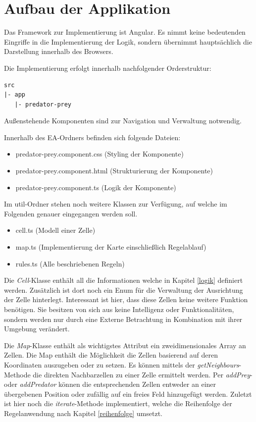 \documentclass[]{scrartcl}
\begin{document}
\newpage
\section{Aufbau der Applikation}
\label{aufbau}
Das Framework zur Implementierung ist Angular. Es nimmt keine bedeutenden Eingriffe in die Implementierung der Logik, sondern übernimmt hauptsächlich die Darstellung innerhalb des Browsers.


Die Implementierung erfolgt innerhalb nachfolgender Orderstruktur:
\begin{lstlisting}[backgroundcolor=\color{lightgray}]
src
|- app
   |- predator-prey
\end{lstlisting}
Außenstehende Komponenten sind zur Navigation und Verwaltung notwendig.

Innerhalb des EA-Ordners befinden sich folgende Dateien:
\begin{itemize}
\item predator-prey.component.css (Styling der Komponente)
\item predator-prey.component.html (Strukturierung der Komponente)
\item predator-prey.component.ts (Logik der Komponente)
\end{itemize}

Im util-Ordner stehen noch weitere Klassen zur Verfügung, auf welche im Folgenden genauer eingegangen werden soll.
\begin{itemize}
	\item cell.ts (Modell einer Zelle)
	\item map.ts (Implementierung der Karte einschließlich Regelablauf)
	\item rules.ts (Alle beschriebenen Regeln)
\end{itemize}

Die \textit{Cell}-Klasse enthält all die Informationen welche in Kapitel \ref{logik} definiert werden. Zusätzlich ist dort noch ein Enum für die Verwaltung der Ausrichtung der Zelle hinterlegt. Interessant ist hier, dass diese Zellen keine weitere Funktion benötigen. Sie besitzen von sich aus keine Intelligenz oder Funktionalitäten, sondern werden nur durch eine Externe Betrachtung in Kombination mit ihrer Umgebung verändert.

Die \textit{Map}-Klasse enthält als wichtigstes Attribut ein zweidimensionales Array an Zellen. Die Map enthält die Möglichkeit die Zellen basierend auf deren Koordinaten auszugeben oder zu setzen. Es können mittels der \textit{getNeighbours}-Methode die direkten Nachbarzellen zu einer Zelle ermittelt werden. Per \textit{addPrey}- oder \textit{addPredator} können die entsprechenden Zellen entweder an einer übergebenen Position oder zufällig auf ein freies Feld hinzugefügt werden. Zuletzt ist hier noch die \textit{iterate}-Methode implementiert, welche die Reihenfolge der Regelanwendung nach Kapitel \ref{reihenfolge} umsetzt.
\end{document}

